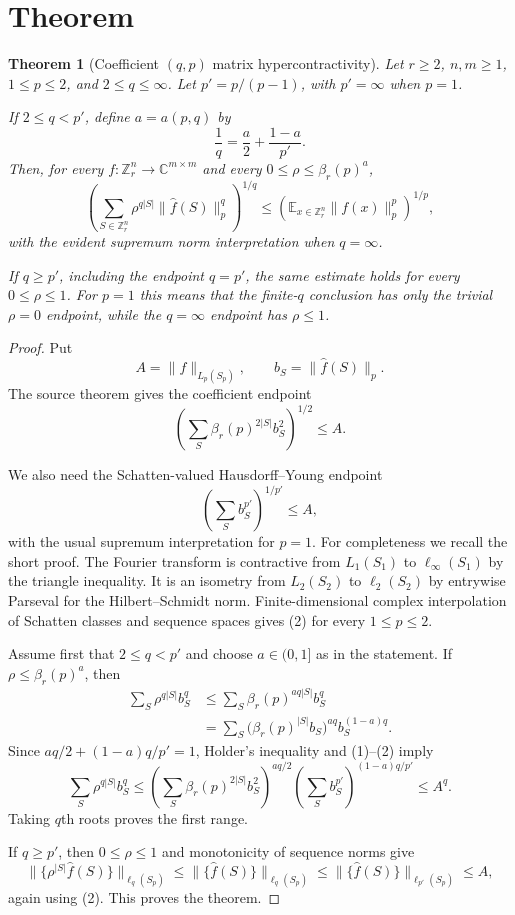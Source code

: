 \documentclass[11pt]{article}
\newtheorem{theorem}{Theorem}
\newcommand{\C}{\mathbb C}
\newcommand{\Z}{\mathbb Z}
\newcommand{\E}{\mathbb E}
\begin{document}
\section*{Theorem}

\begin{theorem}[Coefficient $(q,p)$ matrix hypercontractivity]
\label{thm:main}
Let $r\geq 2$, $n,m\geq 1$, $1\leq p\leq 2$, and $2\leq q\leq\infty$.
Let $p'=p/(p-1)$, with $p'=\infty$ when $p=1$.

If $2\leq q<p'$, define $a=a(p,q)$ by
\[
  \frac1q=\frac a2+\frac{1-a}{p'}.
\]
Then, for every $f:\Z_r^n\to \C^{m\times m}$ and every
$0\leq \rho\leq \beta_r(p)^a$,
\[
  \left(\sum_{S\in \Z_r^n}\rho^{q|S|}\|\widehat f(S)\|_p^q\right)^{1/q}
  \leq
  \left(\E_{x\in \Z_r^n}\|f(x)\|_p^p\right)^{1/p},
\]
with the evident supremum norm interpretation when $q=\infty$.

If $q\geq p'$, including the endpoint $q=p'$, the same estimate holds for
every $0\leq \rho\leq 1$.
For $p=1$ this means that the finite-$q$ conclusion has only the trivial
$\rho=0$ endpoint, while the $q=\infty$ endpoint has $\rho\leq 1$.
\end{theorem}

\begin{proof}
Put
\[
  A=\|f\|_{L_p(S_p)}, \qquad b_S=\|\widehat f(S)\|_p.
\]
The source theorem gives the coefficient endpoint
\[
  \left(\sum_S \beta_r(p)^{2|S|} b_S^2\right)^{1/2}\leq A.
  \tag{1}
\]

We also need the Schatten-valued Hausdorff--Young endpoint
\[
  \left(\sum_S b_S^{p'}\right)^{1/p'}\leq A,
  \tag{2}
\]
with the usual supremum interpretation for $p=1$. For completeness we recall
the short proof. The Fourier transform is contractive from
$L_1(S_1)$ to $\ell_\infty(S_1)$ by the triangle inequality. It is an isometry
from $L_2(S_2)$ to $\ell_2(S_2)$ by entrywise Parseval for the Hilbert--Schmidt
norm. Finite-dimensional complex interpolation of Schatten classes and
sequence spaces gives (2) for every $1\leq p\leq 2$.

Assume first that $2\leq q<p'$ and choose $a\in(0,1]$ as in the statement.
If $\rho\leq \beta_r(p)^a$, then
\[
\begin{aligned}
  \sum_S \rho^{q|S|}b_S^q
  &\leq
  \sum_S \beta_r(p)^{aq|S|} b_S^q  \\
  &=
  \sum_S \bigl(\beta_r(p)^{|S|}b_S\bigr)^{aq}
          b_S^{(1-a)q}.
\end{aligned}
\]
Since $aq/2+(1-a)q/p'=1$, Holder's inequality and (1)--(2) imply
\[
  \sum_S \rho^{q|S|}b_S^q
  \leq
  \left(\sum_S \beta_r(p)^{2|S|}b_S^2\right)^{aq/2}
  \left(\sum_S b_S^{p'}\right)^{(1-a)q/p'}
  \leq A^q.
\]
Taking $q$th roots proves the first range.

If $q\geq p'$, then $0\leq\rho\leq 1$ and monotonicity of sequence norms give
\[
  \|\{\rho^{|S|}\widehat f(S)\}\|_{\ell_q(S_p)}
  \leq
  \|\{\widehat f(S)\}\|_{\ell_q(S_p)}
  \leq
  \|\{\widehat f(S)\}\|_{\ell_{p'}(S_p)}
  \leq A,
\]
again using (2). This proves the theorem.
\end{proof}
\end{document}
